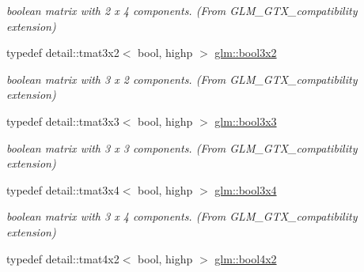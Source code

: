 \begin{CompactItemize}
\begin{CompactList}\small\item\em boolean matrix with 2 x 4 components. (From GLM\_\-GTX\_\-compatibility extension) \item\end{CompactList}\item 
\hypertarget{group__gtx__compatibility_gcf961fda4c64459911f552cbffdbffa8}{
typedef detail::tmat3x2$<$ bool, highp $>$ \hyperlink{group__gtx__compatibility_gcf961fda4c64459911f552cbffdbffa8}{glm::bool3x2}}
\label{group__gtx__compatibility_gcf961fda4c64459911f552cbffdbffa8}

\begin{CompactList}\small\item\em boolean matrix with 3 x 2 components. (From GLM\_\-GTX\_\-compatibility extension) \item\end{CompactList}\item 
\hypertarget{group__gtx__compatibility_ge9cc5d3d9c72543e303af4d702bf7b40}{
typedef detail::tmat3x3$<$ bool, highp $>$ \hyperlink{group__gtx__compatibility_ge9cc5d3d9c72543e303af4d702bf7b40}{glm::bool3x3}}
\label{group__gtx__compatibility_ge9cc5d3d9c72543e303af4d702bf7b40}

\begin{CompactList}\small\item\em boolean matrix with 3 x 3 components. (From GLM\_\-GTX\_\-compatibility extension) \item\end{CompactList}\item 
\hypertarget{group__gtx__compatibility_gf68d62e1c790fa3f09ef5e866af690f1}{
typedef detail::tmat3x4$<$ bool, highp $>$ \hyperlink{group__gtx__compatibility_gf68d62e1c790fa3f09ef5e866af690f1}{glm::bool3x4}}
\label{group__gtx__compatibility_gf68d62e1c790fa3f09ef5e866af690f1}

\begin{CompactList}\small\item\em boolean matrix with 3 x 4 components. (From GLM\_\-GTX\_\-compatibility extension) \item\end{CompactList}\item 
\hypertarget{group__gtx__compatibility_ga431c2e87e8d78c4780c938a9483d6ff}{
typedef detail::tmat4x2$<$ bool, highp $>$ \hyperlink{group__gtx__compatibility_ga431c2e87e8d78c4780c938a9483d6ff}{glm::bool4x2}}
\label{group__gtx__compatibility_ga431c2e87e8d78c4780c938a9483d6ff}


\end{CompactItemize}
